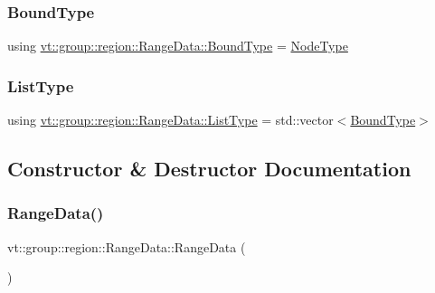 \subsubsection{\texorpdfstring{Bound\+Type}{BoundType}}
{\footnotesize\ttfamily using \hyperlink{structvt_1_1group_1_1region_1_1_range_data_a12ca75365c79bece7d169149b354011d}{vt\+::group\+::region\+::\+Range\+Data\+::\+Bound\+Type} =  \hyperlink{namespacevt_a866da9d0efc19c0a1ce79e9e492f47e2}{Node\+Type}}

\mbox{\label{structvt_1_1group_1_1region_1_1_range_data_a2450bd305df0f74edca0a864a3d21017}} 
\subsubsection{\texorpdfstring{List\+Type}{ListType}}
{\footnotesize\ttfamily using \hyperlink{structvt_1_1group_1_1region_1_1_range_data_a2450bd305df0f74edca0a864a3d21017}{vt\+::group\+::region\+::\+Range\+Data\+::\+List\+Type} =  std\+::vector$<$\hyperlink{structvt_1_1group_1_1region_1_1_range_data_a12ca75365c79bece7d169149b354011d}{Bound\+Type}$>$}



\subsection{Constructor \& Destructor Documentation}
\mbox{\label{structvt_1_1group_1_1region_1_1_range_data_a8b5df2211262d2886fa3a1dbc915cbe3}} 
\subsubsection{\texorpdfstring{Range\+Data()}{RangeData()}\hspace{0.1cm}{\footnotesize\ttfamily [1/2]}}
{\footnotesize\ttfamily vt\+::group\+::region\+::\+Range\+Data\+::\+Range\+Data (\begin{DoxyParamCaption}{ }\end{DoxyParamCaption})\hspace{0.3cm}{\ttfamily [default]}}

